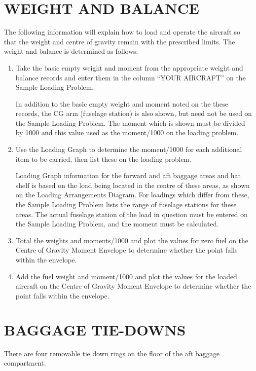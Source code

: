 \clearpage

\section{WEIGHT AND BALANCE}

The following information will explain how to load and operate the aircraft so that the weight and centre of gravity remain with the prescribed limits.  The weight and balance is determined as follows:

\begin{enumerate}
\item Take the basic empty weight and moment from the appropriate weight and balance records and enter them in the column ``YOUR AIRCRAFT'' on the Sample Loading Problem.
\begin{Note}
In addition to the basic empty weight and moment noted on the these records, the CG arm (fuselage station) is also shown, but need not be used on the Sample Loading Problem.  The moment which is shown must be divided by 1000 and this value used as the moment/1000 on the loading problem.
\end{Note}
\item Use the Loading Graph to determine the moment/1000 for each additional item to be carried, then list these on the loading problem.
\begin{Note}
Loading Graph information for the forward and aft baggage areas and hat shelf is based on the
 load being located in the centre of these areas, as shown on the Loading Arrangements 
 Diagram.  For loadings which differ from these, the Sample Loading Problem lists the range of fuselage 
 stations for these areas.  The actual fuselage station of the load in question must be entered on the Sample Loading Problem, and the moment must be calculated.
\end{Note}

\item Total the weights and moments/1000 and plot the values for zero fuel on the Centre of Gravity Moment Envelope to determine whether the point falls within the envelope.
\item Add the fuel weight and moment/1000 and plot the values for the loaded aircraft on the Centre of Gravity Moment Envelope to determine whether the point falls within the envelope.
\end{enumerate}

\section{BAGGAGE TIE-DOWNS}
There are four removable tie down rings on the floor of the aft baggage compartment.

